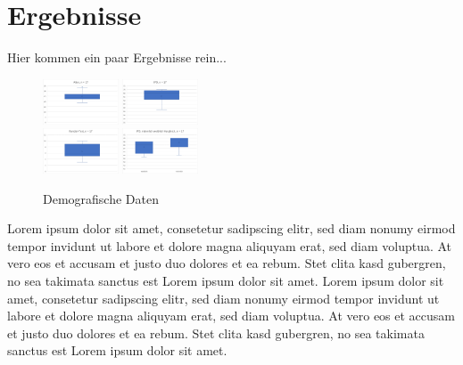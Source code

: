\documentclass[conference]{IEEEtran}
\begin{document}
\section{Ergebnisse}
Hier kommen ein paar Ergebnisse rein...
\begin{figure}[ht]
	\centering
	\includegraphics[width=0.2\textwidth]{assets/alter.png} \hspace{-5pt}
	\includegraphics[width=0.2\textwidth]{assets/ipd.png} \\
	\vspace{2pt}
	\includegraphics[width=0.2\textwidth]{assets/randot.png} \hspace{-5pt}
	\includegraphics[width=0.2\textwidth]{assets/ipd_mvw.png}\\
	\caption{Demografische Daten}
	\label{fig:Demografische Daten}
\end{figure}
Lorem ipsum dolor sit amet, consetetur sadipscing elitr, sed diam nonumy eirmod tempor invidunt ut labore et dolore magna aliquyam erat, sed diam voluptua. At vero eos et accusam et justo duo dolores et ea rebum. Stet clita kasd gubergren, no sea takimata sanctus est Lorem ipsum dolor sit amet. Lorem ipsum dolor sit amet, consetetur sadipscing elitr, sed diam nonumy eirmod tempor invidunt ut labore et dolore magna aliquyam erat, sed diam voluptua. At vero eos et accusam et justo duo dolores et ea rebum. Stet clita kasd gubergren, no sea takimata sanctus est Lorem ipsum dolor sit amet.
\end{document}
